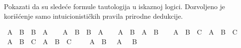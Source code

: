\begin{isabellebody}
\begin{exercise}[subtitle=Intuicionistička pravila prirodne dedukcije u iskaznoj logici]
%
\endisadelimproof
%
\end{exercise}
%
\begin{exercise}[subtitle=Dokazi u prirodnoj dedukciji]
%
\begin{isamarkuptext}%
Pokazati da su sledeće formule tautologija u iskaznoj logici. 
      Dozvoljeno je korišćenje samo intuicionističkih pravila prirodne dedukcije.%
\end{isamarkuptext}\isamarkuptrue%
\isamarkupfalse%
\ {\isachardoublequoteopen}A\ {\isasymand}\ B\ {\isasymlongrightarrow}\ B\ {\isasymand}\ A{\isachardoublequoteclose}\isanewline
\ \ %
\isadelimproof
%
\endisadelimproof
%
\isatagproof
%
\endisatagproof
{\isafoldproof}%
%
\isadelimproof
%
\endisadelimproof
\isanewline
{}\isamarkupfalse%
\ {\isachardoublequoteopen}A\ {\isasymor}\ B\ {\isasymlongrightarrow}\ B\ {\isasymor}\ A{\isachardoublequoteclose}\isanewline
\ \ %
\isadelimproof
%
\endisadelimproof
%
\isatagproof
%
\endisatagproof
{\isafoldproof}%
%
\isadelimproof
%
\endisadelimproof
\isanewline
{}\isamarkupfalse%
\ {\isachardoublequoteopen}A\ {\isasymand}\ B\ {\isasymlongrightarrow}\ A\ {\isasymor}\ B{\isachardoublequoteclose}\isanewline
\ \ %
\isadelimproof
%
\endisadelimproof
%
\isatagproof
%
\endisatagproof
{\isafoldproof}%
%
\isadelimproof
%
\endisadelimproof
\isanewline
{}\isamarkupfalse%
\ {\isachardoublequoteopen}{\isacharparenleft}{\kern0pt}A\ {\isasymand}\ B\ {\isasymlongrightarrow}\ C{\isacharparenright}{\kern0pt}\ {\isasymlongrightarrow}\ {\isacharparenleft}{\kern0pt}A\ {\isasymlongrightarrow}\ {\isacharparenleft}{\kern0pt}B\ {\isasymlongrightarrow}\ C{\isacharparenright}{\kern0pt}{\isacharparenright}{\kern0pt}{\isachardoublequoteclose}\isanewline
\ \ %
\isadelimproof
%
\endisadelimproof
%
\isatagproof
%
\endisatagproof
{\isafoldproof}%
%
\isadelimproof
%
\endisadelimproof
\isanewline
{}\isamarkupfalse%
\ {\isachardoublequoteopen}{\isacharparenleft}{\kern0pt}A\ {\isasymlongrightarrow}\ {\isacharparenleft}{\kern0pt}B\ {\isasymlongrightarrow}\ C{\isacharparenright}{\kern0pt}{\isacharparenright}{\kern0pt}\ {\isasymlongrightarrow}\ {\isacharparenleft}{\kern0pt}A\ {\isasymand}\ B\ {\isasymlongrightarrow}\ C{\isacharparenright}{\kern0pt}{\isachardoublequoteclose}\isanewline
\ \ %
\isadelimproof
%
\endisadelimproof
%
\isatagproof
%
\endisatagproof
{\isafoldproof}%
%
\isadelimproof
%
\endisadelimproof
\isanewline
{}\isamarkupfalse%
\ {\isachardoublequoteopen}{\isasymnot}\ {\isacharparenleft}{\kern0pt}A\ {\isasymor}\ B{\isacharparenright}{\kern0pt}\ {\isasymlongrightarrow}\ {\isasymnot}\ A\ {\isasymand}\ {\isasymnot}\ B{\isachardoublequoteclose}\isanewline

\end{exercise}
\end{isabellebody}
